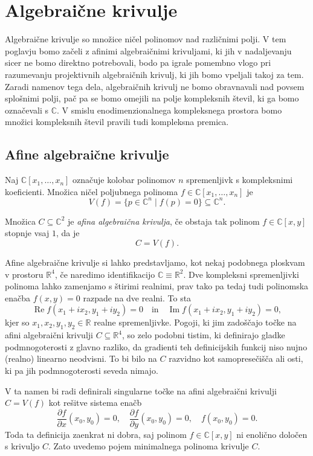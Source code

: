 \documentclass[mat1]{fmfdelo}
\numberwithin{equation}{section}
\newcommand{\R}{\mathbb R}
\newcommand{\C}{\mathbb C}
\newcommand{\pdv}[2][]{\frac{\partial#1}{\partial#2}}
\renewcommand\Re{\operatorname{Re}}%
\renewcommand\Im{\operatorname{Im}}%
\theoremstyle{definition}
\begin{document}
\section{Algebraične krivulje} \label{algebraicne krivulje}
Algebraične krivulje so množice ničel polinomov nad različnimi polji. V tem poglavju bomo začeli 
z afinimi
algebraičnimi krivuljami, ki jih v nadaljevanju sicer ne bomo direktno potrebovali, bodo pa igrale pomembno
vlogo pri razumevanju projektivnih algebraičnih krivulj, ki jih bomo vpeljali takoj za tem. 
Zaradi namenov tega dela, algebraičnih krivulj ne bomo obravnavali nad povsem splošnimi polji, pač pa se
bomo omejili na polje kompleksnih števil, ki ga bomo označevali s $\C$. V smislu enodimenzionalnega kompleksnega prostora bomo množici kompleksnih števil pravili tudi kompleksna premica.


\subsection{Afine algebraične krivulje} 
Naj $\C[x_1, \dots, x_n]$ označuje kolobar polinomov $n$ spremenljivk s
kompleksnimi koeficienti. Množica ničel poljubnega polinoma $f \in \C[x_1, \dots, x_n]$ je
\[
    V(f) = \{p \in \C^n \mid f(p) = 0 \} \subseteq \C^n.
\] 

\begin{definicija}
    Množica $C \subseteq \C^2$ je \emph{afina algebraična krivulja}, če obstaja tak polinom $f \in \C[x,y]$ stopnje vsaj $1$, da je
    \[
        C = V(f).
    \]
\end{definicija}

Afine algebraične krivulje si lahko predstavljamo, kot nekaj podobnega ploskvam v prostoru $\R^4$, če naredimo identifikacijo $\C \equiv \R^2$. Dve kompleksni spremenljivki polinoma lahko zamenjamo s štirimi realnimi, prav tako pa tedaj tudi polinomska enačba $f(x,y) = 0$ razpade na dve realni. To sta
\[
    \Re f(x_1 + ix_2, y_1 + iy_2) = 0 \quad \text{in} \quad \Im f(x_1 + ix_2, y_1 + iy_2) = 0,
\]
kjer so $x_1, x_2, y_1, y_2 \in \R$ realne spremenljivke.
Pogoji, ki jim zadoščajo točke na afini algebraični krivulji $C \subseteq \R^4$, so zelo podobni tistim, ki definirajo gladke pod\-mnogoterosti z glavno razliko, da gradienti teh definicijskih funkcij niso nujno (realno) linearno neodvisni. To bi bilo na $C$ razvidno kot samopresečišča ali osti, ki pa jih podmnogoterosti seveda nimajo. 
\par
V ta namen bi radi definirali singularne točke na afini algebraični krivulji $C = V(f)$ kot rešitve sistema enačb 
\[ 
    \pdv[f]{x}(x_0, y_0) = 0, \quad \pdv[f]{y}(x_0, y_0) = 0, \quad f(x_0, y_0) = 0.
\]
Toda ta definicija zaenkrat ni dobra, saj polinom $f \in \C[x,y]$ ni enolično določen s krivuljo $C$. 
Zato uvedemo pojem minimalnega polinoma krivulje $C$.
\end{document}
